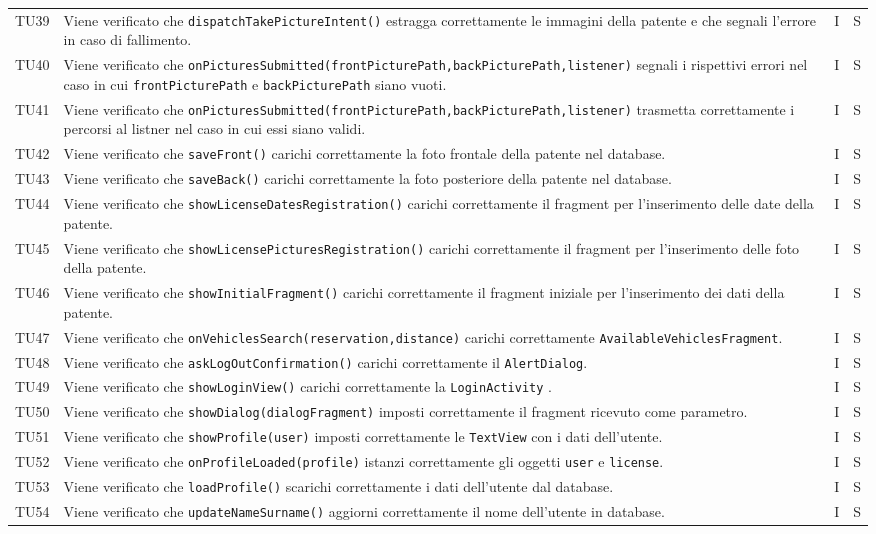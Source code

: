 \begin{longtable}{ >{\centering}p{}  >{\centering}p{} >{\centering}p{}
			>{\centering}p{}}
		TU39 & Viene verificato che \texttt{dispatchTakePictureIntent()} estragga correttamente le immagini della patente e che segnali l'errore in caso di fallimento. & I & S
		\tabularnewline	
		TU40 & Viene verificato che \texttt{onPicturesSubmitted(frontPicturePath,backPicturePath,listener)} segnali i rispettivi errori nel caso in cui \texttt{frontPicturePath} e \texttt{backPicturePath} siano vuoti. & I & S
		\tabularnewline	
		TU41 & Viene verificato che \texttt{onPicturesSubmitted(frontPicturePath,backPicturePath,listener)} trasmetta correttamente i percorsi al listner nel caso in cui essi siano validi. & I & S
		\tabularnewline	
		TU42 & Viene verificato che \texttt{saveFront()} carichi correttamente la foto frontale della patente nel database. & I & S
		\tabularnewline	
		TU43 & Viene verificato che \texttt{saveBack()} carichi correttamente la foto posteriore della patente nel database. & I & S
		\tabularnewline	
		TU44 & Viene verificato che \texttt{showLicenseDatesRegistration()} carichi correttamente il fragment per l'inserimento delle date della patente. & I & S
		\tabularnewline	
		TU45 & Viene verificato che \texttt{showLicensePicturesRegistration()} carichi correttamente il fragment per l'inserimento delle foto della patente. & I & S
		\tabularnewline	
		TU46 & Viene verificato che \texttt{showInitialFragment()} carichi correttamente il fragment iniziale per l'inserimento dei dati della patente. & I & S
		\tabularnewline	
		TU47 & Viene verificato che \texttt{onVehiclesSearch(reservation,distance)} carichi correttamente \texttt{AvailableVehiclesFragment}. & I & S
		\tabularnewline	
		TU48 & Viene verificato che \texttt{askLogOutConfirmation()} carichi correttamente il \texttt{AlertDialog}. & I & S
		\tabularnewline	
		TU49 & Viene verificato che \texttt{showLoginView()} carichi correttamente la \texttt{LoginActivity} . & I & S
		\tabularnewline	
		TU50 & Viene verificato che \texttt{showDialog(dialogFragment)} imposti correttamente il fragment ricevuto come parametro. & I & S
		\tabularnewline	
		TU51 & Viene verificato che \texttt{showProfile(user)} imposti correttamente le \texttt{TextView} con i dati dell'utente. & I & S
		\tabularnewline	
		TU52 & Viene verificato che \texttt{onProfileLoaded(profile)} istanzi correttamente gli oggetti \texttt{user} e \texttt{license}. & I & S
		\tabularnewline	
		TU53 & Viene verificato che \texttt{loadProfile()} scarichi correttamente i dati dell'utente dal database. & I & S
		\tabularnewline	
		TU54 & Viene verificato che \texttt{updateNameSurname()} aggiorni correttamente il nome dell'utente in database. & I & S

\end{longtable}
